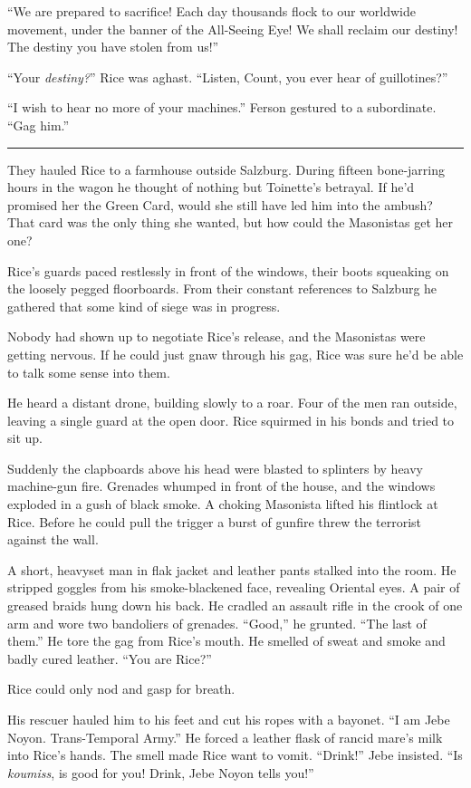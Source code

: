 ``We are prepared to sacrifice! Each day thousands flock to our worldwide movement, under the banner of the All-Seeing Eye! We shall reclaim our destiny! The destiny you have stolen from us!''

``Your \textit{destiny?}'' Rice was aghast. ``Listen, Count, you ever hear of guillotines?''

``I wish to hear no more of your machines.'' Ferson gestured to a subordinate. ``Gag him.''

\fancybreak{* * *}

They hauled Rice to a farmhouse outside Salzburg. During fifteen bone-jarring hours in the wagon he thought of nothing but Toinette's betrayal. If he'd promised her the Green Card, would she still have led him into the ambush? That card was the only thing she wanted, but how could the Masonistas get her one?

Rice's guards paced restlessly in front of the windows, their boots squeaking on the loosely pegged floorboards. From their constant references to Salzburg he gathered that some kind of siege was in progress.

Nobody had shown up to negotiate Rice's release, and the Masonistas were getting nervous. If he could just gnaw through his gag, Rice was sure he'd be able to talk some sense into them.

He heard a distant drone, building slowly to a roar. Four of the men ran outside, leaving a single guard at the open door. Rice squirmed in his bonds and tried to sit up.

Suddenly the clapboards above his head were blasted to splinters by heavy machine-gun fire. Grenades whumped in front of the house, and the windows exploded in a gush of black smoke. A choking Masonista lifted his flintlock at Rice. Before he could pull the trigger a burst of gunfire threw the terrorist against the wall.

A short, heavyset man in flak jacket and leather pants stalked into the room. He stripped goggles from his smoke-blackened face, revealing Oriental eyes. A pair of greased braids hung down his back. He cradled an assault rifle in the crook of one arm and wore two bandoliers of grenades. ``Good,'' he grunted. ``The last of them.'' He tore the gag from Rice's mouth. He smelled of sweat and smoke and badly cured leather. ``You are Rice?''

Rice could only nod and gasp for breath.

His rescuer hauled him to his feet and cut his ropes with a bayonet. ``I am Jebe Noyon. Trans-Temporal Army.'' He forced a leather flask of rancid mare's milk into Rice's hands. The smell made Rice want to vomit. ``Drink!'' Jebe insisted. ``Is \textit{koumiss}, is good for you! Drink, Jebe Noyon tells you!''

